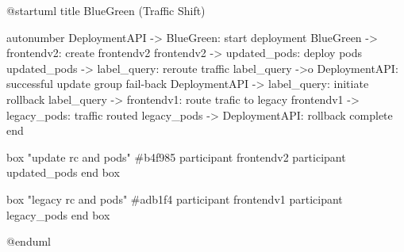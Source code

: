 @startuml
title BlueGreen (Traffic Shift)

autonumber
DeploymentAPI -> BlueGreen: start deployment
BlueGreen -> frontendv2: create frontendv2
frontendv2 -> updated_pods: deploy pods
updated_pods -> label_query: reroute traffic
label_query ->o DeploymentAPI: successful update
group fail-back
  DeploymentAPI -> label_query: initiate rollback
  label_query -> frontendv1: route trafic to legacy
  frontendv1 -> legacy_pods: traffic routed
  legacy_pods -> DeploymentAPI: rollback complete
end

box "update rc and pods" #b4f985
  participant frontendv2
  participant updated_pods
end box

box "legacy rc and pods" #adb1f4
  participant frontendv1
  participant legacy_pods
end box

@enduml

